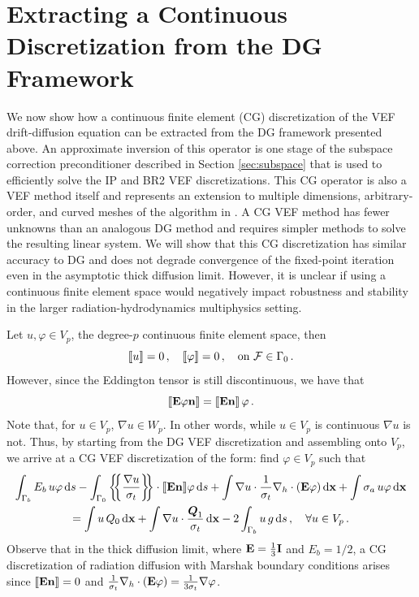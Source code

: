\documentclass[../doc.tex]{subfiles}
\begin{document}
\section{Extracting a Continuous Discretization from the DG Framework} \label{dgvef_sec:cfem}
We now show how a continuous finite element (CG) discretization of the VEF drift-diffusion equation can be extracted from the DG framework presented above. An approximate inversion of this operator is one stage of the subspace correction preconditioner described in Section \ref{sec:subspace} that is used to efficiently solve the IP and BR2 VEF discretizations. This CG operator is also a VEF method itself and represents an extension to multiple dimensions, arbitrary-order, and curved meshes of the algorithm in \cite{two-level-independent-warsa}. A CG VEF method has fewer unknowns than an analogous DG method and requires simpler methods to solve the resulting linear system. We will show that this CG discretization has similar accuracy to DG and does not degrade convergence of the fixed-point iteration even in the asymptotic thick diffusion limit. However, it is unclear if using a continuous finite element space would negatively impact robustness and stability in the larger radiation-hydrodynamics multiphysics setting. 

Let $u,\varphi \in V_p$, the degree-$p$ continuous finite element space, then 
	\begin{equation}
		\left\llbracket u \right\rrbracket = 0 \,, \quad \left\llbracket\varphi \right\rrbracket = 0 \,, \quad \text{on} \ \mathcal{F}\in\Gamma_0 \,. 
	\end{equation}
However, since the Eddington tensor is still discontinuous, we have that 
	\begin{equation}
		\left\llbracket\boldsymbol{\mathrm{E}}\varphi\boldsymbol{\mathrm{n}} \right\rrbracket = \left\llbracket\boldsymbol{\mathrm{E}}\boldsymbol{\mathrm{n}} \right\rrbracket \varphi \,. 
	\end{equation}
Note that, for $u\in V_p$, $\nabla u \in W_p$. In other words, while $u\in V_p$ is continuous $\nabla u$ is not. Thus, by starting from the DG VEF discretization and assembling onto $V_p$, we arrive at a CG VEF discretization of the form: find $\varphi \in V_p$ such that 
	\begin{multline} \label{dgvef:cg}
		\int_{\Gamma_b} E_b\, u \varphi \ud s - \int_{\Gamma_0} \avg{\frac{\nabla u}{\sigma_t}} \cdot \jump{\E\n}\!\varphi \ud s 
		+ \int \nabla u \cdot \frac{1}{\sigma_t}\nablah\cdot\paren{\E\varphi} \ud \x + \int \sigma_a\, u \varphi \ud \x \\ 
		= \int u\, Q_0 \ud \x + \int \nabla u \cdot \frac{\vec{Q}_1}{\sigma_t} \ud \x - 2\int_{\Gamma_b} u\, g \ud s \,, \quad \forall u \in V_p \,. 
	\end{multline}
Observe that in the thick diffusion limit, where $\boldsymbol{\mathrm{E}} = \frac{1}{3}\boldsymbol{\mathrm{I}}$ and $E_b = 1/2$, a CG discretization of radiation diffusion with Marshak boundary conditions arises since $\left\llbracket\boldsymbol{\mathrm{E}}\boldsymbol{\mathrm{n}} \right\rrbracket = 0$ and $\frac{1}{\sigma_t}\nabla_h\cdot\left( \boldsymbol{\mathrm{E}}\varphi \right) = \frac{1}{3\sigma_t}\nabla \varphi$. 
\end{document}
